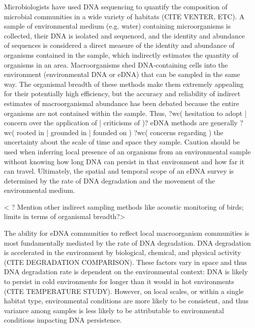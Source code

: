 \documentclass[11pt,letterpaper]{article} %
\begin{document}
Microbiologists have used DNA sequencing to quantify the composition of microbial communities in a wide variety of habitats (CITE VENTER, ETC). %
A sample of environmental medium (e.g. water) containing microorganisms is collected, their DNA is isolated and sequenced, and the identity and abundance of sequences is considered a direct measure of the identity and abundance of organisms contained in the sample, which indirectly estimates the quantity of organisms in an area.
Macroorganisms shed DNA-containing cells into the environment (environmental DNA or eDNA) that can be sampled in the same way.
The organismal breadth of these methods make them extremely appealing for their potentially high efficiency, but the accuracy and reliability of indirect estimates of macroorganismal abundance has been debated because the entire organisms are not contained within the sample.
Thus, ?wc( hesitation to adopt | concern over the application of | criticisms of )? eDNA methods are generally ?wc( rooted in | grounded in | founded on ) ?wc( concerns regarding ) the uncertainty about the scale of time and space they sample.
Caution should be used when inferring local presence of an organisms from an environmental sample without knowing how long DNA can persist in that environment and how far it can travel.
Ultimately, the spatial and temporal scope of an eDNA survey is determined by the rate of DNA degradation and the movement of the environmental medium.

< ? Mention other indirect sampling methods like acoustic monitoring of birds; limits in terms of organismal breadth?>


The ability for eDNA communities to reflect local macroorganism communities is most fundamentally mediated by the rate of DNA degradation.
DNA degradation is accelerated in the environment by biological, chemical, and physical activity (CITE DEGRADATION COMPARISON). %
These factors vary in space and thus DNA degradation rate is dependent on the environmental context:
DNA is likely to persist in cold environments for longer than it would in hot environments (CITE TEMPERATURE STUDY).
However, on local scales, or within a single habitat type, environmental conditions are more likely to be consistent, and thus variance among samples is less likely to be attributable to environmental conditions impacting DNA persistence.
\end{document}
